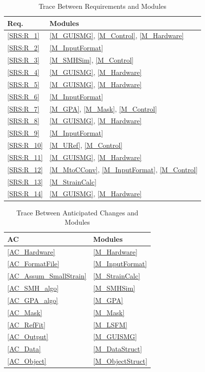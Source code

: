 \documentclass[12pt, titlepage]{article}
\begin{document}
\begin{table}[H]
\centering
\begin{tabular}{p{} p{}}
\toprule
\textbf{Req.} & \textbf{Modules}\\
\midrule
\cref{SRS:R_1} & \cref{M_GUISMG}, \cref{M_Control}, \cref{M_Hardware} \\
\cref{SRS:R_2} & \cref{M_InputFormat} \\
\cref{SRS:R_3} & \cref{M_SMHSim}, \cref{M_Control} \\
\cref{SRS:R_4} & \cref{M_GUISMG}, \cref{M_Hardware} \\
\cref{SRS:R_5} & \cref{M_GUISMG}, \cref{M_Hardware} \\
\cref{SRS:R_6} & \cref{M_InputFormat} \\
\cref{SRS:R_7} & \cref{M_GPA}, \cref{M_Mask}, \cref{M_Control} \\
\cref{SRS:R_8} & \cref{M_GUISMG}, \cref{M_Hardware} \\
\cref{SRS:R_9} & \cref{M_InputFormat} \\
\cref{SRS:R_10} & \cref{M_URef}, \cref{M_Control} \\
\cref{SRS:R_11} & \cref{M_GUISMG}, \cref{M_Hardware} \\
\cref{SRS:R_12} & \cref{M_MtoCConv}, \cref{M_InputFormat}, \cref{M_Control} \\
\cref{SRS:R_13} & \cref{M_StrainCalc} \\
\cref{SRS:R_14} & \cref{M_GUISMG}, \cref{M_Hardware}\\
\bottomrule
\end{tabular}
\caption{Trace Between Requirements and Modules}
\label{TblRT}
\end{table}

\begin{table}[H]
\centering
\begin{tabular}{p{} p{}}
\toprule
\textbf{AC} & \textbf{Modules}\\
\midrule
\cref{AC_Hardware} & \cref{M_Hardware}\\
\cref{AC_FormatFile} & \cref{M_InputFormat}\\
\cref{AC_Assum_SmallStrain} & \cref{M_StrainCalc}\\
\cref{AC_SMH_algo} & \cref{M_SMHSim}\\
\cref{AC_GPA_algo} & \cref{M_GPA}\\
\cref{AC_Mask} & \cref{M_Mask}\\
\cref{AC_RefFit} & \cref{M_LSFM}\\
\cref{AC_Output} & \cref{M_GUISMG}\\
\cref{AC_Data} & \cref{M_DataStruct}\\
\cref{AC_Object} & \cref{M_ObjectStruct}\\
\bottomrule
\end{tabular}
\caption{Trace Between Anticipated Changes and Modules}
\label{TblACT}
\end{table}
\end{document}

